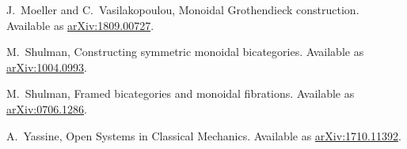 \documentclass{amsart}
\begin{document}
\begin{thebibliography}{100}


 J.\ Moeller and C.\ Vasilakopoulou, Monoidal Grothendieck construction. Available as \href{https://arxiv.org/abs/1809.00727}{arXiv:1809.00727}.






 M.\ Shulman, Constructing symmetric monoidal bicategories. Available as \href{http://arxiv.org/abs/1004.0993}{arXiv:1004.0993}.

 M.\ Shulman, Framed bicategories and monoidal fibrations. Available as \href{https://arxiv.org/abs/0706.1286}{arXiv:0706.1286}.


 A.\ Yassine, Open Systems in Classical Mechanics. Available as \href{https://arxiv.org/abs/1710.11392}{arXiv:1710.11392}.

\end{thebibliography}
\end{document}
